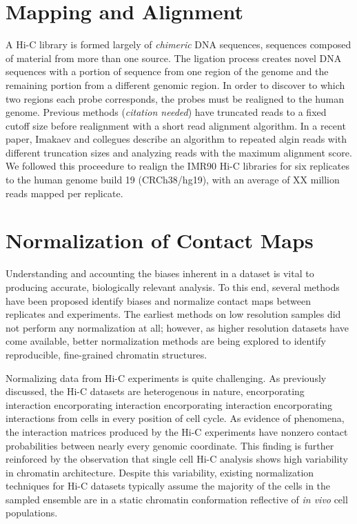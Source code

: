 \documentclass[phd,tocprelim]{cornell}
\begin{document}




\section{Mapping and Alignment}

A Hi-C library is formed largely of \textit{chimeric} DNA sequences,
sequences composed of material from more than one source.  The ligation process
creates novel DNA sequences with a portion of sequence from one region of
the genome and the remaining portion from a different genomic region.  In
order to discover to which two regions each probe corresponds, the probes
must be realigned to the human genome.  Previous methods (\textit{citation needed})
have truncated reads to a fixed cutoff size before realignment with a short
read alignment algorithm.  In a recent paper, Imakaev and collegues
describe an algorithm to repeated algin reads with different truncation sizes
and analyzing reads with the maximum alignment score\cite{imakaev2012}.  We followed
this proceedure to realign the IMR90 Hi-C libraries for six replicates to
the human genome build 19 (CRCh38/hg19), with an average of XX million reads
mapped per replicate.

\section{Normalization of Contact Maps}

Understanding and accounting the biases inherent in a dataset is vital to
producing accurate, biologically relevant analysis.  To this end, several methods
have been proposed identify biases and normalize contact maps between replicates
and experiments\cite{yaffe2011}\cite{hu2012}\cite{yang2014}.  The earliest methods on low
resolution samples did not perform any normalization at all\cite{aiden2009};
however, as higher resolution datasets have come available, better
normalization methods are being explored to identify reproducible,
fine-grained chromatin structures.

Normalizing data from Hi-C experiments is quite challenging.  As previously
discussed, the Hi-C datasets are heterogenous in nature, encorporating interaction encorporating interaction encorporating interaction encorporating
interactions from cells in every position of cell cycle.  As evidence of phenomena,
the interaction matrices produced by the Hi-C experiments have nonzero contact
probabilities between nearly every genomic coordinate\cite{dekker2013}.  This
finding is further reinforced by the observation that single cell Hi-C analysis
shows high variability in chromatin architecture\cite{nagano2013}.  Despite this
variability, existing normalization techniques for Hi-C datasets typically
assume the majority of the cells in the sampled ensemble are in a static
chromatin conformation reflective of \textit{in vivo} cell populations.
\end{document}
